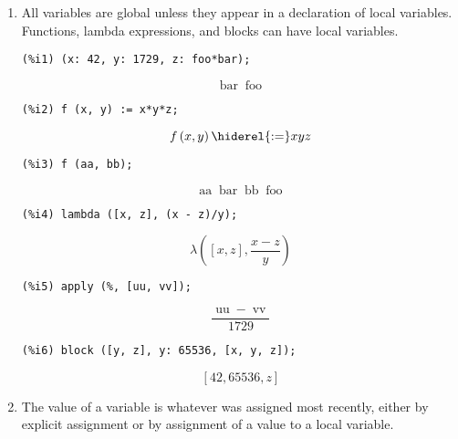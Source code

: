 \documentclass[12pt,leqno]{article}
\begin{document}
\begin{enumerate}

\item All variables are global unless they appear in a declaration of local variables.
Functions, lambda expressions, and blocks can have local variables.

\begin{verbatim}
(%i1) (x: 42, y: 1729, z: foo*bar);
\end{verbatim}
\begin{dmath}[number={\(\mathop{\mathrm{\%o}_{1}}\)}]
\mathop{\mathrm{bar}} \mathop{\mathrm{foo}}
\end{dmath}
\begin{verbatim}
(%i2) f (x, y) := x*y*z;
\end{verbatim}
\begin{dmath}[number={\(\mathop{\mathrm{\%o}_{2}}\)}]
f\left(x, y\right) \hiderel{:=} x y z
\end{dmath}
\begin{verbatim}
(%i3) f (aa, bb);
\end{verbatim}
\begin{dmath}[number={\(\mathop{\mathrm{\%o}_{3}}\)}]
\mathop{\mathrm{aa}} \mathop{\mathrm{bar}} \mathop{\mathrm{bb}} \mathop{\mathrm{foo}}
\end{dmath}
\begin{verbatim}
(%i4) lambda ([x, z], (x - z)/y);
\end{verbatim}
\begin{dmath}[number={\(\mathop{\mathrm{\%o}_{4}}\)}]
\lambda\left(\left[x, z\right], \frac{x-z}{y}\right)
\end{dmath}
\begin{verbatim}
(%i5) apply (%, [uu, vv]);
\end{verbatim}
\begin{dmath}[number={\(\mathop{\mathrm{\%o}_{5}}\)}]
\frac{\mathop{\mathrm{uu}}-\mathop{\mathrm{vv}}}{1729}
\end{dmath}
\begin{verbatim}
(%i6) block ([y, z], y: 65536, [x, y, z]);
\end{verbatim}
\begin{dmath}[number={\(\mathop{\mathrm{\%o}_{6}}\)}]
\left[42, 65536, z\right]
\end{dmath}


\item The value of a variable is whatever was assigned most recently,
either by explicit assignment or by assignment of a value to a local variable.


\end{enumerate}
\end{document}
